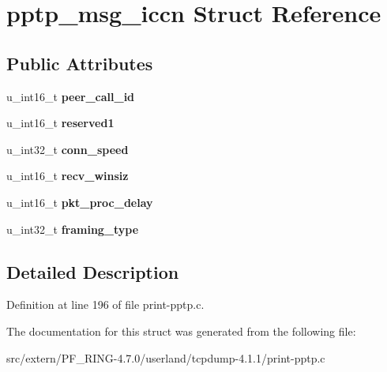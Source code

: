 \hypertarget{structpptp__msg__iccn}{
\section{pptp\_\-msg\_\-iccn Struct Reference}
\label{structpptp__msg__iccn}
}
\subsection*{Public Attributes}
\begin{DoxyCompactItemize}
\item 
\hypertarget{structpptp__msg__iccn_ab9ebbaefd0aff5250c22fa2e459fa348}{
u\_\-int16\_\-t {\bfseries peer\_\-call\_\-id}}
\label{structpptp__msg__iccn_ab9ebbaefd0aff5250c22fa2e459fa348}

\item 
\hypertarget{structpptp__msg__iccn_a49631ff42016611ecd54be5c13c6d469}{
u\_\-int16\_\-t {\bfseries reserved1}}
\label{structpptp__msg__iccn_a49631ff42016611ecd54be5c13c6d469}

\item 
\hypertarget{structpptp__msg__iccn_a2905f58ad269ac409d01228f8f497b0e}{
u\_\-int32\_\-t {\bfseries conn\_\-speed}}
\label{structpptp__msg__iccn_a2905f58ad269ac409d01228f8f497b0e}

\item 
\hypertarget{structpptp__msg__iccn_a75ad2225f82acf416d46b7b62ba89682}{
u\_\-int16\_\-t {\bfseries recv\_\-winsiz}}
\label{structpptp__msg__iccn_a75ad2225f82acf416d46b7b62ba89682}

\item 
\hypertarget{structpptp__msg__iccn_ad0d5eeab93ec67bcb52d7510cba38837}{
u\_\-int16\_\-t {\bfseries pkt\_\-proc\_\-delay}}
\label{structpptp__msg__iccn_ad0d5eeab93ec67bcb52d7510cba38837}

\item 
\hypertarget{structpptp__msg__iccn_a139ff7fac180889142ef128750901fd2}{
u\_\-int32\_\-t {\bfseries framing\_\-type}}
\label{structpptp__msg__iccn_a139ff7fac180889142ef128750901fd2}

\end{DoxyCompactItemize}


\subsection{Detailed Description}


Definition at line 196 of file print-\/pptp.c.



The documentation for this struct was generated from the following file:\begin{DoxyCompactItemize}
\item 
src/extern/PF\_\-RING-\/4.7.0/userland/tcpdump-\/4.1.1/print-\/pptp.c\end{DoxyCompactItemize}
